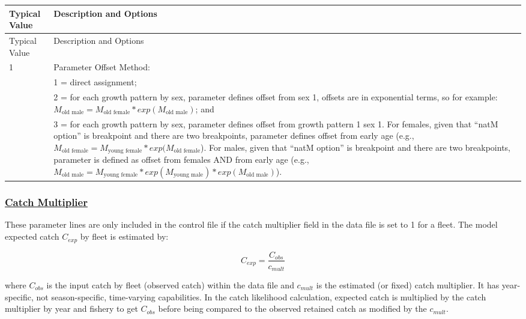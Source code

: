\begin{longtable}{p{0.5cm} p{2cm} p{13cm}}
	\hline	
	\multicolumn{2}{l}{Typical Value} & Description and Options \Tstrut\Bstrut\\
	\hline
	\endfirsthead

	\hline
	\multicolumn{2}{l}{Typical Value} & Description and Options \Tstrut\Bstrut\\
	\hline
	\endhead
	\hline

	\endfoot
	
	\endlastfoot

	 1 & & Parameter Offset Method: \Tstrut\Bstrut\\
	   & & 1 = direct assignment; \\
	   & & 2 = for each growth pattern by sex, parameter defines offset from sex 1, offsets are in exponential terms, so for example: $M_{\text{old male}} = M_{\text{old female}}*exp(M_{\text{old male}})$; and \\
	   & & 3 = for each growth pattern by sex, parameter defines offset from growth pattern 1 sex 1. For females, given that ``natM option'' is breakpoint and there are two breakpoints, parameter defines offset from early age (e.g., $M_{\text{old female}} = M_{\text{young female}}*exp(M_{\text{old female}}$). For males, given that ``natM option'' is breakpoint and there are two breakpoints, parameter is defined as offset from females AND from early age (e.g., $M_{\text{old male}} = M_{\text{young female}}*exp(M_{\text{young male}})*exp(M_{\text{old male}})$). \Bstrut\\
	\hline
\end{longtable}

\hypertarget{CatchMult}{}
\subsubsection[Catch Multiplier]{\protect\hyperlink{CatchMult}{Catch Multiplier}}
These parameter lines are only included in the control file if the catch multiplier field in the data file is set to 1 for a fleet. The model expected catch $C_{exp}$ by fleet is estimated by:

\begin{equation}
C_{exp} = \frac{C_{obs}}{c_{mult}}
\end{equation}

where $C_{obs}$ is the input catch by fleet (observed catch) within the data file and $c_{mult}$ is the estimated (or fixed) catch multiplier. It has year-specific, not season-specific, time-varying capabilities. In the catch likelihood calculation, expected catch is multiplied by the catch multiplier by year and fishery to get $C_{obs}$ before being compared to the observed retained catch as modified by the $c_{mult}$.

